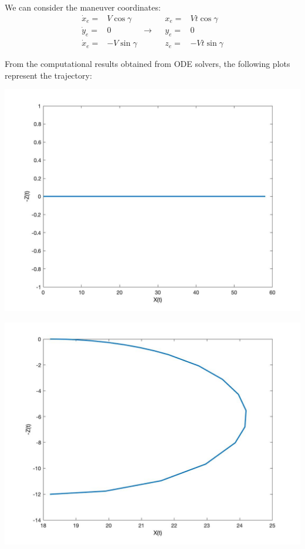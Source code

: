 We can consider the maneuver coordinates:
\begin{align*}
	\dot{x}_e=&V\cos\gamma&&&	x_e=&Vt\cos\gamma \\
	\dot{y}_e=&0& \rightarrow&&	y_e=&0\\
	\dot{x}_e=&-V\sin\gamma&&&z_e=&-Vt\sin\gamma
\end{align*}

From the computational results obtained from ODE solvers, the following plots represent the trajectory:
\begin{center}
	\includegraphics[width=\linewidth]{../matlab/t1.jpg}
	\vspace{0.25cm}
	\vspace{0.25cm}
\end{center}

\begin{center}
	\includegraphics[width=\linewidth]{../matlab/t2.jpg}
	\vspace{0.25cm}
	\vspace{0.25cm}
\end{center}

